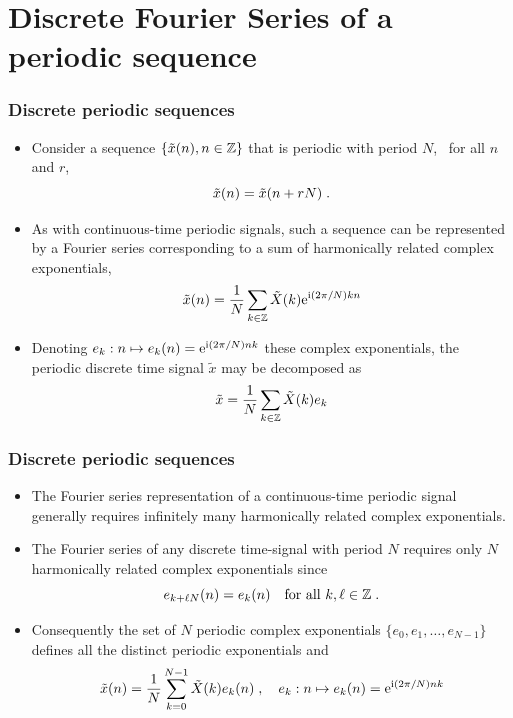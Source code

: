 \section{Discrete Fourier Series of a periodic sequence}
\begin{frame}
\frametitle{Discrete periodic sequences}
\begin{itemize}
\item Consider a sequence $\{ \tilde{x}(n), n \in \mathbb{Z} \}$ that is \alert{periodic} with period $N$, \ie\ for all $n$ and $r$,
\[
\tilde{x}(n)= \tilde{x}(n + rN) \;.
\]
\item As with continuous-time periodic signals, such a sequence can be represented by a Fourier series corresponding to a sum of \alert{harmonically} related complex exponentials,
\[
\tilde{x}(n)= \frac{1}{N} \sum_{k \in \mathbb{Z}} \tilde{X}(k) \mathrm{e}^{\mathrm{i} (2 \pi/ N) k n}
\]
\item Denoting $e_k: n \mapsto e_k(n)= \mathrm{e}^{\mathrm{i} (2 \pi / N) n k}$ these complex exponentials, the periodic discrete time signal $\tilde{x}$ may be decomposed as
\[
\tilde{x}= \frac{1}{N} \sum_{k \in \mathbb{Z}} \tilde{X}(k) e_k
\]
\end{itemize}
\end{frame}

\begin{frame}
\frametitle{Discrete periodic sequences}
\begin{itemize}
\item  The Fourier series representation of a continuous-time periodic signal generally requires infinitely many harmonically related complex exponentials.
\item The Fourier series of any discrete time-signal with period $N$ requires only $N$ harmonically related complex exponentials since 
\[
e_{k + \ell N}(n)= e_k(n) \quad \text{for all $k, \ell \in \mathbb{Z}$} \;.
\]
\item Consequently the set of $N$ periodic complex exponentials $\{e_0, e_1, \dots, e_{N-1}\}$ defines all the distinct periodic
exponentials and
\[
\tilde{x}(n) = \frac{1}{N} \sum_{k=0}^{N-1} \tilde{X}(k) e_k(n) \;, \quad e_k: n \mapsto e_k(n)= \mathrm{e}^{\mathrm{i} (2 \pi / N)n k}
\]
\end{itemize}
\end{frame}

